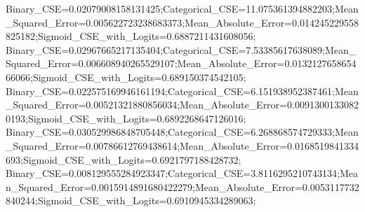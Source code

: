 Binary_CSE=0.02079008158131425;Categorical_CSE=11.075361394882203;Mean_Squared_Error=0.005622723238683373;Mean_Absolute_Error=0.014245229558825182;Sigmoid_CSE_with_Logits=0.6887211431608056;
Binary_CSE=0.02967665217135404;Categorical_CSE=7.53385617638089;Mean_Squared_Error=0.006608940265529107;Mean_Absolute_Error=0.013212765865466066;Sigmoid_CSE_with_Logits=0.689150374542105;
Binary_CSE=0.022575169946161194;Categorical_CSE=6.151938952387461;Mean_Squared_Error=0.00521321880856034;Mean_Absolute_Error=0.00913001330820193;Sigmoid_CSE_with_Logits=0.6892268647126016;
Binary_CSE=0.030529986848705448;Categorical_CSE=6.268868574729333;Mean_Squared_Error=0.00786612769438614;Mean_Absolute_Error=0.0168519841334693;Sigmoid_CSE_with_Logits=0.6921797188428732;
Binary_CSE=0.008129555284923347;Categorical_CSE=3.8116295210743134;Mean_Squared_Error=0.0015914891680422279;Mean_Absolute_Error=0.0053117732840244;Sigmoid_CSE_with_Logits=0.6910945334289063;
